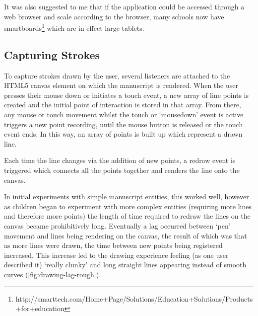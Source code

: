 It was also suggested to me that if the application could be accessed through a web browser and scale according to the browser, many schools now have smartboards\footnote{http://smarttech.com/Home+Page/Solutions/Education+Solutions/Products+for+education} which are in effect large tablets.

\subsection{Capturing Strokes}
\label{sec:capturing-strokes}
To capture strokes drawn by the user, several listeners are attached to the HTML5 canvas element on which the manuscript is rendered. When the user presses their mouse down or initiates a touch event, a new array of line points is created and the initial point of interaction is stored in that array. From there, any mouse or touch movement whilst the touch or `mousedown' event is active triggers a new point recording, until the mouse button is released or the touch event ends. In this way, an array of points is built up which represent a drawn line.

Each time the line changes via the addition of new points, a redraw event is triggered which connects all the points together and renders the line onto the canvas.

In initial experiments with simple manuscript entities, this worked well, however as children began to experiment with more complex entities (requiring more lines and therefore more points) the length of time required to redraw the lines on the canvas became prohibitively long. Eventually a lag occurred between `pen' movement and lines being rendering on the canvas, the result of which was that as more lines were drawn, the time between new points being registered increased. This increase led to the drawing experience feeling (as one user described it) `really clunky' and long straight lines appearing instead of smooth curves (\cref{fig:drawing-lag-rough}).


